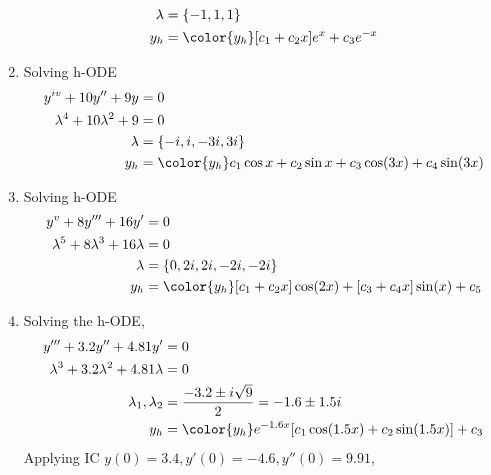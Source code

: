 \begin{enumerate}
\begin{align}
              \lambda                                 & = \{-1, 1, 1\}        \\
              y_{h}                                   & = {\color{y_h} [c_{1}
                  + c_{2}x]e^{x} +
              c_{3}e^{-x}}
          \end{align}
    \item Solving h-ODE
          \begin{align}
              y^{iv} + 10y'' + 9y             & = 0                        \\
              \lambda^{4} + 10\lambda^{2} + 9 & = 0                        \\
              \lambda                         & = \{-i, i, -3i, 3i\}       \\
              y_{h}                           & = {\color{y_h} c_{1}\cos x
              + c_{2} \sin x + c_{3}\cos(3x) + c_{4}\sin(3x) }
          \end{align}
    \item Solving h-ODE
          \begin{align}
              y^{v} + 8y''' + 16y'                   & = 0                       \\
              \lambda^{5} + 8\lambda^{3} + 16\lambda & = 0                       \\
              \lambda                                & = \{0, 2i, 2i, -2i, -2i\} \\
              y_{h}                                  & = {\color{y_h} [c_{1}
                  + c_{2}x]\cos(2x) +
              [c_{3} + c_{4}x]\sin(x) + c_{5} }
          \end{align}
    \item Solving the h-ODE,
          \begin{align}
              y''' + 3.2y'' + 4.81y'                     & = 0           \\
              \lambda^{3} + 3.2\lambda^{2} + 4.81\lambda & = 0           \\
              \lambda_{1}, \lambda_{2}                   & = \frac{-3.2
              \pm i\sqrt{9}}{2} = -1.6 \pm 1.5i                          \\
              y_{h}                                      & = \color{y_h}
              e^{-1.6x}[c_{1}\cos(1.5x)
                      + c_{2}\sin(1.5x)] + c_{3}
          \end{align}
          Applying IC $ y(0) = 3.4, y'(0) = -4.6, y''(0) = 9.91 $,
          \begin{align}

\end{align}
\end{enumerate}
